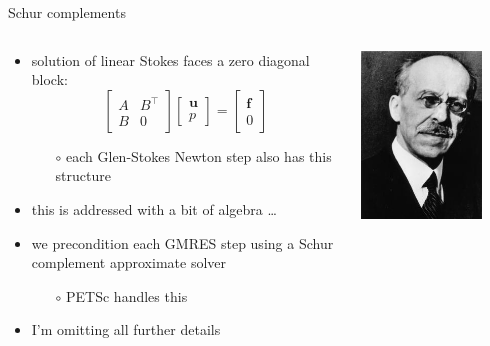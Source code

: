 \documentclass[10pt,hyperref,dvipsnames]{beamer}
\newcommand{\bbf}{\mathbf{f}}
\newcommand{\bu}{\mathbf{u}}
\begin{document}
\begin{frame}{Schur complements}

\begin{columns}
\begin{column}{0.75\textwidth}
\begin{itemize}
\item solution of linear Stokes faces a zero diagonal block:
  $$\begin{bmatrix} A & B^\top \\ B & 0 \end{bmatrix} \begin{bmatrix} \bu \\ p  \end{bmatrix} = \begin{bmatrix} \bbf \\ 0 \end{bmatrix}$$
    \begin{itemize}
    \item[$\circ$] each Glen-Stokes Newton step also has this structure
    \end{itemize}
\item this is addressed with a bit of algebra \dots
\item we \alert{precondition} each GMRES step using a \alert{Schur complement} approximate solver
    \begin{itemize}
    \item[$\circ$] PETSc handles this
    \end{itemize}
\item I'm omitting all further details
\end{itemize}
\end{column}
\begin{column}{0.2\textwidth}
\vspace{25mm}

\hfill \includegraphics[width=0.8\textwidth]{figs/people/ischur.jpg}


\end{column}
\end{columns}
\end{frame}
\end{document}
